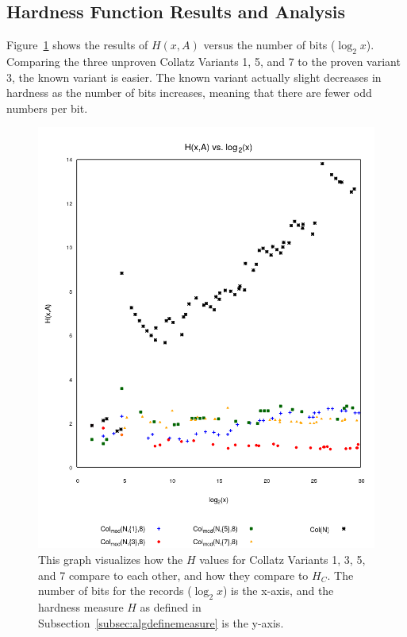 \subsection{Hardness Function Results and Analysis} \label{subsubsec:algsinhardness}
Figure~\ref{fig:hvslog} shows the results of $H(x,A)$ versus the number of bits ($\log_2{x}$). Comparing the three unproven Collatz Variants 1, 5, and 7 to the proven variant 3, the known variant is easier. The known variant actually slight decreases in hardness as the number of bits increases, meaning that there are fewer odd numbers per bit. \par
\begin{figure}
    \centering
    \includegraphics[scale=0.6]{ModAvoidanceAnalysisPics/H_vs_log.png}
    \caption{This graph visualizes how the $H$ values for Collatz Variants 1, 3, 5, and 7 compare to each other, and how they compare to $H_C$. The number of bits for the records ($\log_2{x}$) is the x-axis, and the hardness measure $H$ as defined in Subsection~\ref{subsec:algdefinemeasure} is the y-axis.}
    \label{fig:hvslog}
\end{figure}

